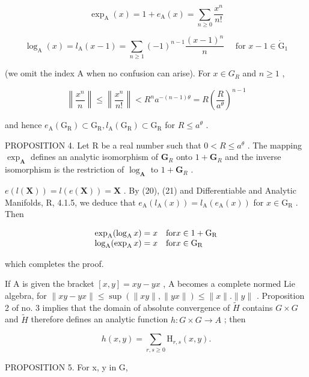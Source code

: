 \[
\exp_ {\mathrm{A}} (x) = 1 + e _ {\mathrm{A}} (x) = \sum_ {n \geqslant 0} \frac {x ^ {n}}{n !}\tag{22}
\]

\[
\log_ {\mathrm{A}} (x) = l _ {\mathrm{A}} (x - 1) = \sum_ {n \geqslant 1} (- 1) ^ {n - 1} \frac {(x - 1) ^ {n}}{n} \quad \text { for } x - 1 \in \dot {\mathrm{G}} _ {1}\tag{23}
\]

(we omit the index A when no confusion can arise). For \(x \in G_R\) and \(n \geqslant 1\) ,

\[
\left\| \frac {x ^ {n}}{n} \right\| \leqslant \left\| \frac {x ^ {n}}{n !} \right\| <   R ^ {n} a ^ {- (n - 1) \theta} = R \left(\frac {R}{a ^ {\theta}}\right) ^ {n - 1}\tag{24}
\]

and hence \(e_{\mathrm{A}}(\mathrm{G}_{\mathrm{R}}) \subset \mathrm{G}_{\mathrm{R}}, l_{\mathrm{A}}(\mathrm{G}_{\mathrm{R}}) \subset \mathrm{G}_{\mathrm{R}}\) for \(R \leqslant a^{\theta}\) .

PROPOSITION 4. Let R be a real number such that \(0 < R \leqslant a^{\theta}\) . The mapping \(\exp_{\mathbf{A}}\) defines an analytic isomorphism of \(\mathbf{G}_{R}\) onto \(1 + \mathbf{G}_{R}\) and the inverse isomorphism is the restriction of \(\log_{\mathbf{A}}\) to \(1 + \mathbf{G}_{R}\) .

\(e(l(\mathbf{X})) = l(e(\mathbf{X})) = \mathbf{X}\) . By (20), (21) and Differentiable and Analytic Manifolds, R, 4.1.5, we deduce that \(e_{\mathrm{A}}(l_{\mathrm{A}}(x)) = l_{\mathrm{A}}(e_{\mathrm{A}}(x))\) for \(x \in \mathrm{G}_{\mathrm{R}}\) . Then

\[
\begin{array}{l l} \exp_ {\mathrm{A}} (\log_ {\mathrm{A}} x) = x & \text {for} x \in 1 + \mathrm{G} _ {\mathrm{R}} \\ \log_ {\mathrm{A}} (\exp_ {\mathrm{A}} x) = x & \text {for} x \in \mathrm{G} _ {\mathrm{R}} \end{array}
\]

which completes the proof.

If A is given the bracket \([x,y]=xy-yx\) , A becomes a complete normed Lie algebra, for \(\|xy-yx\|\leqslant\sup(\|xy\|,\|yx\|)\leqslant\|x\|. \|y\|\) . Proposition 2 of no. 3 implies that the domain of absolute convergence of \(\tilde{H}\) contains \(G\times G\) and \(\tilde{H}\) therefore defines an analytic function \(h:G\times G\to A\) ; then

\[
h (x, y) = \sum_ {r, s \geqslant 0} \mathrm{H} _ {r, s} (x, y).\tag{25}
\]

PROPOSITION 5. For x, y in G,

